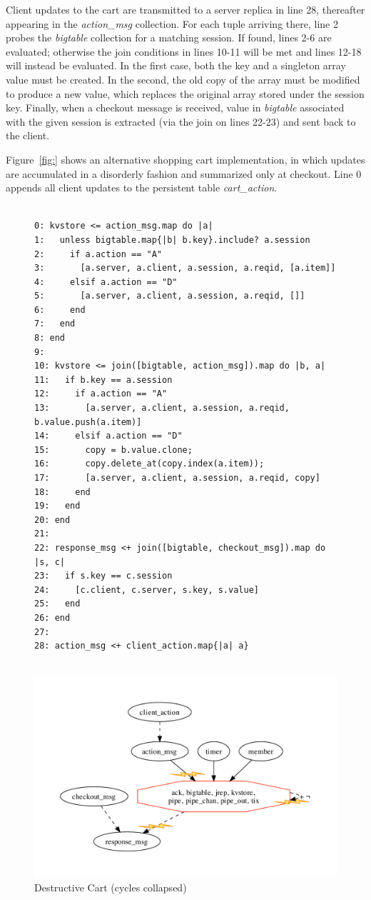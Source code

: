 Client updates to the cart are transmitted to a server replica in line 28,
thereafter appearing in the \emph{action\_msg} collection.  For each tuple
arriving there, line 2 probes the \emph{bigtable} collection for a matching
session.  If found, lines 2-6 are evaluated; otherwise the join conditions
in lines 10-11 will be met and lines 12-18 will instead be evaluated.
In the first case, both the key and a singleton array value must be created.
In the second, the old copy of the array must be modified to produce a new 
value, which replaces the original array stored under the session key.
Finally, when a checkout message is received, value in \emph{bigtable}
associated with the given session is extracted (via the join on lines 22-23)
and sent back to the client.

Figure~\ref{fig:} shows an alternative shopping cart implementation, in which
updates are accumulated in a disorderly fashion and summarized only at 
checkout.  Line 0 appends all client updates to the persistent table 
\emph{cart\_action}.  


\begin{figure}[t]
\begin{tiny}
\begin{verbatim}

0: kvstore <= action_msg.map do |a|
1:   unless bigtable.map{|b| b.key}.include? a.session
2:     if a.action == "A"
3:       [a.server, a.client, a.session, a.reqid, [a.item]]
4:     elsif a.action == "D"
5:       [a.server, a.client, a.session, a.reqid, []]
6:     end
7:   end
8: end
9: 
10: kvstore <= join([bigtable, action_msg]).map do |b, a|
11:   if b.key == a.session
12:     if a.action == "A"
13:       [a.server, a.client, a.session, a.reqid, b.value.push(a.item)]
14:     elsif a.action == "D"
15:       copy = b.value.clone;
16:       copy.delete_at(copy.index(a.item));
17:       [a.server, a.client, a.session, a.reqid, copy]
18:     end
19:   end
20: end
21:
22: response_msg <+ join([bigtable, checkout_msg]).map do |s, c|
23:   if s.key == c.session
24:     [c.client, c.server, s.key, s.value]
25:   end
26: end
27: 
28: action_msg <+ client_action.map{|a| a}


\end{verbatim}
\end{tiny}
\centering
\includegraphics[width=0.9\linewidth]{fig/destructive.pdf}

\caption{Destructive Cart (cycles collapsed)}
\label{fig:pdg-destructive}
\end{figure}


